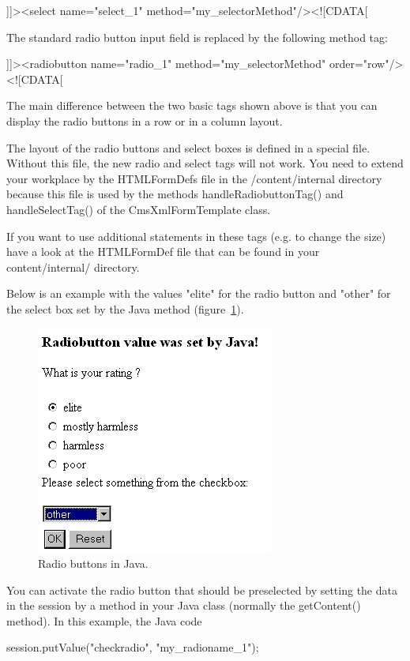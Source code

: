 {\code ]]><select name="select\_1" method="my\_selectorMethod"/><![CDATA[}

The standard radio button input field is replaced by the following
method tag:

{\code ]]><radiobutton name="radio\_1" method="my\_selectorMethod" order="row"/><![CDATA[}

The main difference between the two basic tags shown above is that you
can display the radio buttons in a row or in a column layout.

The layout of the radio buttons and select boxes is defined in a special
file. Without this file, the new radio and select tags will not work.
You need to extend your workplace by the HTMLFormDefs file in the
/content/internal directory because this file is used by the methods
{\tag handleRadiobuttonTag()} and {\tag handleSelectTag()} of the {\class CmsXmlFormTemplate}
class.

If you want to use additional statements in these tags (e.g. to change
the size) have a look at the HTMLFormDef file that can be found in your
{\dir content/internal/} directory.

Below is an example with the values "elite" for the radio button and
"other" for the select box set by the Java method (figure~\ref{RadioButtons}).

\begin{figure}
\begin{center}
\includegraphics[clip,width=0.4\linewidth]{pics/modules/47}
\end{center}
\caption[Radio buttons in Java]{Radio buttons in Java.}
\label{RadioButtons}
\end{figure}

You can activate the radio button that should be preselected by setting
the data  in the session by a method in your Java class (normally the
{\meth getContent()} method). In this example, the Java code 

\begin{java}
{\code session.putValue("checkradio", "my\_radioname\_1")};
\end{java}

